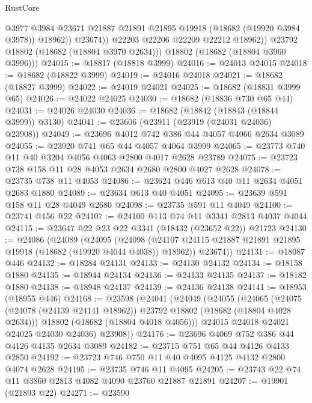 \begin{lexlean}{RustCore}
\begin{coremodule}
                    @3977
                    @3984
                    @23671
                    @21887
                    @21891
                    @21895
                    @19918
                    (@18682 (@19920 @3984 @3978))
                    @18962))
                @23674))
            @22203
            @22206
            @22209
            @22212
            @18962))
        @23792
        @18802
        (@18682 (@18804 @3970 @2634)))
      @18802
      (@18682 (@18804 @3960 @3996)))
@24015 := @18817 (@18818 @3999)
@24016 := @24013 @24015
@24018 := @18682 (@18822 @3999)
@24019 := @24016 @24018
@24021 := @18682 (@18827 @3999)
@24022 := @24019 @24021
@24025 := @18682 (@18831 @3999 @65)
@24026 := @24022 @24025
@24030 := @18682 (@18836 @730 @65 @44)
@24031 := @24026 @24030
@24036 := @18682 (@18842 (@18843 (@18844 @3999)) @3130)
@24041 := @23606 (@23911 (@23919 (@24031 @24036) @23908))
@24049 := @23696 @4012 @742 @386 @44 @4057 @4066 @2634 @3089
@24055 := @23920 @741 @65 @44 @4057 @4064 @3999
@24065 := @23773 @740 @11 @40 @3204 @4056 @4063 @2800 @4017 @2628 @23789
@24075 := @23723 @738 @158 @11 @28 @4053 @2634 @2680 @2800 @4027 @2628
@24078 := @23735 @738 @11 @4053
@24086 := @23624 @446 @613 @40 @11 @2634 @4051 @2683 @1880
@24089 := @23634 @613 @40 @4051
@24095 := @23639 @591 @158 @11 @28 @4049 @2680
@24098 := @23735 @591 @11 @4049
@24100 := @23741 @156 @22
@24107 := @24100 @113 @74 @11 @3341 @2813 @4037 @4044
@24115 := @23647 @22 @23 @22 @3341 (@18432 (@23652 @22)) @21723
@24130 := @24086
    (@24089
      (@24095
        (@24098 (@24107 @24115 @21887 @21891 @21895 @19918 (@18682 (@19920 @4044 @4038)) @18962))
        @23674))
@24131 := @18087 @446
@24132 := @18284 @24131
@24133 := @24130 @24132
@24134 := @18158 @1880
@24135 := @18944 @24134
@24136 := @24133 @24135
@24137 := @18182 @1880
@24138 := @18948 @24137
@24139 := @24136 @24138
@24141 := @18953 (@18955 @446)
@24168 := @23598
    (@24041
      (@24049
        (@24055
          (@24065
            (@24075 (@24078 (@24139 @24141 @18962)) @23792 @18802 (@18682 (@18804 @4028 @2634)))
            @18802
            (@18682 (@18804 @4018 @4056)))
          @24015
          @24018
          @24021
          @24025
          @24030
          @24036)
        @23908))
@24176 := @23696 @4069 @752 @386 @44 @4126 @4135 @2634 @3089
@24182 := @23715 @751 @65 @44 @4126 @4133 @2850
@24192 := @23723 @746 @750 @11 @40 @4095 @4125 @4132 @2800 @4074 @2628
@24195 := @23735 @746 @11 @4095
@24205 := @23743 @22 @74 @11 @3860 @2813 @4082 @4090 @23760 @21887 @21891
@24207 := @19901 (@21893 @22)
@24271 := @23590

\end{coremodule}
\end{lexlean}
